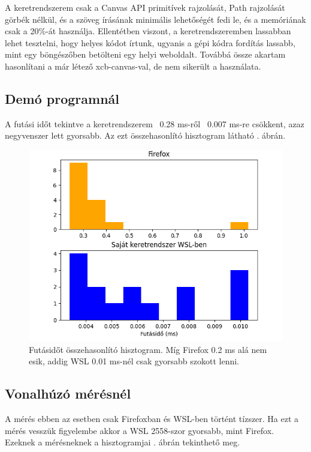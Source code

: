 
A keretrendszerem csak a Canvas API primitívek rajzolását, Path rajzolását görbék nélkül, és a szöveg írásának minimális lehetőségét fedi le, és a memóriának csak a 20\%-át használja. Ellentétben viszont, a keretrendszeremben lassabban lehet tesztelni, hogy helyes kódot írtunk, ugyanis a gépi kódra fordítás lassabb, mint egy böngészőben betölteni egy helyi weboldalt. Továbbá össze akartam hasonlítani a már létező xcb-canvas-val, de nem sikerült a használata.

\subsection{Demó programnál}

A futási időt tekintve a keretrendszerem ~0.28 ms-ről ~0.007 ms-re csökkent, azaz negyvenszer lett gyorsabb.
Az ezt összehasonlító hisztogram látható . ábrán.

\begin{figure}[h!]
    \centering
    \includegraphics[width=14truecm]{images/histogram_compare.png}
    \caption{Futásidőt összehasonlító hisztogram. Míg Firefox 0.2 ms alá nem esik, addig WSL 0.01 ms-nél csak gyorsabb szokott lenni.}
    \label{fig:hist-compare}
\end{figure}

\subsection{Vonalhúzó mérésnél}

A mérés ebben az esetben csak Firefoxban és WSL-ben történt tízszer. Ha ezt a mérés vesszük figyelembe akkor a WSL 2558-szor gyorsabb, mint Firefox. Ezeknek a mérésneknek a hisztogramjai . ábrán tekinthető meg.

